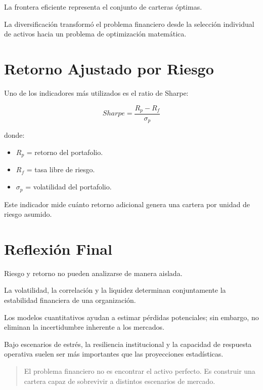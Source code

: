 La frontera eficiente representa el conjunto de carteras óptimas.

\begin{tcolorbox}[colback=green!5,colframe=green!50!black,title=Idea Central]
La diversificación transformó el problema financiero desde la selección individual de activos hacia un problema de optimización matemática.
\end{tcolorbox}

\section{Retorno Ajustado por Riesgo}

Uno de los indicadores más utilizados es el ratio de Sharpe:

\[
Sharpe = \frac{R_p-R_f}{\sigma_p}
\]

donde:

\begin{itemize}
    \item $R_p$ = retorno del portafolio.
    \item $R_f$ = tasa libre de riesgo.
    \item $\sigma_p$ = volatilidad del portafolio.
\end{itemize}

Este indicador mide cuánto retorno adicional genera una cartera por unidad de riesgo asumido.

\section{Reflexión Final}

Riesgo y retorno no pueden analizarse de manera aislada.

La volatilidad, la correlación y la liquidez determinan conjuntamente la estabilidad financiera de una organización.

Los modelos cuantitativos ayudan a estimar pérdidas potenciales; sin embargo, no eliminan la incertidumbre inherente a los mercados.

Bajo escenarios de estrés, la resiliencia institucional y la capacidad de respuesta operativa suelen ser más importantes que las proyecciones estadísticas.

\begin{quote}
El problema financiero no es encontrar el activo perfecto. Es construir una cartera capaz de sobrevivir a distintos escenarios de mercado.
\end{quote}